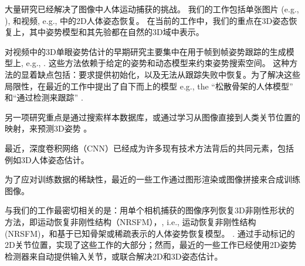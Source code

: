 
大量研究已经解决了图像中人体运动捕获的挑战\cite{moeslund2006survey,sminchisescu20073d,brubaker2010video,deva2011_Book,sarafianos20163d}。
我们的工作包括单张图片 (e.g., \cite{yang2011articulated,toshev2014deep,chen2014articulated,jain2014learning,tompson2014joint}), 和视频, e.g., \cite{sapp2011,cherian2014,nie2015joint,park2015articulated,pfister2015flowing,zhang2015human,newell2016stacked} 中的2D人体姿态恢复。
在当前的工作中，我们的重点在3D姿态恢复上，其中姿势模型和其先验都在自然的3D域中表示。

对视频中的3D单眼姿势估计的早期研究主要集中在用于帧到帧姿势跟踪的生成模型上, e.g.,  \cite{bregler1998tracking,sminchisescu2003kinematic}. 
这些方法依赖于给定的姿势和动态模型来约束姿势搜索空间。
这种方法的显着缺点包括：要求提供初始化，以及无法从跟踪失败中恢复。为了解决这些局限性，在最近的工作中提出了自下而上的模型 e.g., the ``松散骨架的人体模型'' \cite{sigal2012loose} 和``通过检测来跟踪'' \cite{andriluka2010monocular}.

另一项研究重点是通过搜索样本数据库\cite{shakhnarovich2003fast,mori2006recovering,jiang20103d,yasin2016dual}，或通过学习从图像直接到人类关节位置的映射，来预测3D姿势 \cite{agarwal2006recovering,bo2010twin,salzmann2010implicitly,yu2013unconstrained,ionescu2014human,kostrikov2014depth}。

最近，深度卷积网络（CNN）已经成为许多现有技术方法背后的共同元素，包括例如3D人体姿态估计\cite{li20143d,li2015,tekin2015,du2016marker,park20163d,zhou2016deep}。

为了应对训练数据的稀缺性，最近的一些工作通过图形渲染\cite{chen2016synthesizing}或图像拼接\cite{rogez2016mocap}来合成训练图像。 

与我们的工作最密切相关的是：用单个相机捕获的图像序列恢复3D非刚性形状的方法，即运动恢复非刚性结构（NRSFM），\cite{bregler2000recovering,akhter2011trajectory,dai2012simple,zhu2014complex,cho2015complex}, i.e., 运动恢复非刚性结构 (NRSFM)，和基于已知骨架\cite{lee1985determination,taylor2000reconstruction,valmadre2010deterministic,park20113d,radwan2013monocular,leonardos2016articulated}或稀疏表示的人体姿势恢复模型。 \cite{ramakrishna2012reconstructing,fan2014pose,akhter2015pose,zhou20153d,zhou2015sparse}. 通过手动标记的2D关节位置，实现了这些工作的大部分；然而，最近的一些工作已经使用2D姿势检测器来自动提供输入关节\cite{simo2012single,wang2014robust}，或联合解决2D和3D姿态估计\cite{simo2013joint,zhou2014spatio}。



